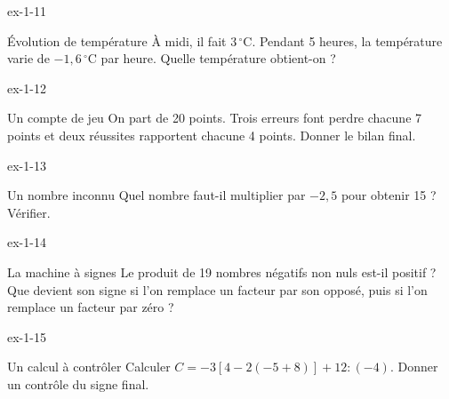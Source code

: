 \begin{blocLivre}{ex-1-11}\begin{exercice}[3]{Évolution de température}
À midi, il fait $3\,^\circ$C. Pendant 5 heures, la température varie de $-1{,}6\,^\circ$C par heure. Quelle température obtient-on ?
\end{exercice}\end{blocLivre}
\begin{blocLivre}{ex-1-12}\begin{exercice}[3]{Un compte de jeu}
On part de 20 points. Trois erreurs font perdre chacune 7 points et deux réussites rapportent chacune 4 points. Donner le bilan final.
\end{exercice}\end{blocLivre}
\begin{blocLivre}{ex-1-13}\begin{exercice}[3]{Un nombre inconnu}
Quel nombre faut-il multiplier par $-2{,}5$ pour obtenir 15 ? Vérifier.
\end{exercice}\end{blocLivre}
\begin{blocLivre}{ex-1-14}\begin{exercice}[3]{La machine à signes}
Le produit de 19 nombres négatifs non nuls est-il positif ? Que devient son signe si l’on remplace un facteur par son opposé, puis si l’on remplace un facteur par zéro ?
\end{exercice}\end{blocLivre}
\begin{blocLivre}{ex-1-15}\begin{exercice}[3]{Un calcul à contrôler}
Calculer $C=-3[4-2(-5+8)]+12:(-4)$. Donner un contrôle du signe final.
\end{exercice}\end{blocLivre}

\clearpage
